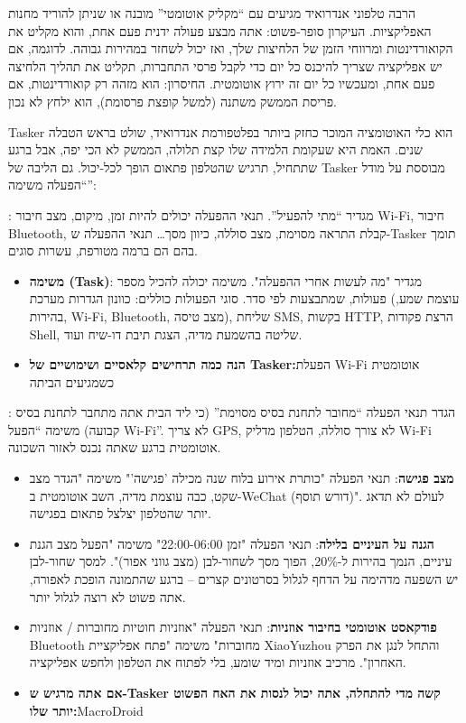 
הרבה טלפוני אנדרואיד מגיעים עם “מקליק אוטומטי” מובנה או שניתן להוריד מחנות האפליקציות. העיקרון סופר-פשוט: אתה מבצע פעולה ידנית פעם אחת, והוא מקליט את הקואורדינטות ומרווחי הזמן של הלחיצות שלך, ואז יכול לשחזר במהירות גבוהה. לדוגמה, אם יש אפליקציה שצריך להיכנס כל יום כדי לקבל פרסי התחברות, תקליט את תהליך הלחיצה פעם אחת, ומעכשיו כל יום זה ירוץ אוטומטית. החיסרון: הוא מזהה רק קואורדינטות, אם פריסת הממשק משתנה (למשל קופצת פרסומת), הוא ילחץ לא נכון.


Tasker הוא כלי האוטומציה המוכר כחזק ביותר בפלטפורמת אנדרואיד, שולט בראש הטבלה שנים. האמת היא שעקומת הלמידה שלו קצת תלולה, הממשק לא הכי יפה, אבל ברגע שתתחיל, תרגיש שהטלפון פתאום הופך לכל-יכול. גם הליבה של Tasker מבוססת על מודל “הפעלה משימה”:


: מגדיר “מתי להפעיל”. תנאי ההפעלה יכולים להיות זמן, מיקום, מצב חיבור Wi-Fi, חיבור Bluetooth, קבלת התראה מסוימת, מצב סוללה, כיוון מסך… תנאי ההפעלה ש-Tasker תומך בהם הם ברמה מטורפת, עשרות סוגים.

\begin{itemize}
  \item \textbf{משימה (Task)}: מגדיר "מה לעשות אחרי ההפעלה". משימה יכולה להכיל מספר פעולות, שמתבצעות לפי סדר. סוגי הפעולות כוללים: כוונון הגדרות מערכת (עוצמת שמע, בהירות, Wi-Fi, Bluetooth, מצב טיסה), שליחת SMS, בקשות HTTP, הרצת פקודות Shell, שליטה בהשמעת מדיה, הצגת תיבת דו-שיח ועוד.
  \item \textbf{הנה כמה תרחישים קלאסיים ושימושיים של Tasker:}הפעלת Wi-Fi אוטומטית כשמגיעים הביתה
\end{itemize}

: הגדר תנאי הפעלה “מחובר לתחנת בסיס מסוימת” (כי ליד הבית אתה מתחבר לתחנת בסיס קבועה) משימה “הפעל Wi-Fi”. לא צריך GPS, לא צורך סוללה, הטלפון מדליק Wi-Fi אוטומטית ברגע שאתה נכנס לאזור השכונה.

\begin{itemize}
  \item \textbf{מצב פגישה}: תנאי הפעלה "כותרת אירוע בלוח שנה מכילה 'פגישה'" משימה "הגדר מצב שקט, כבה עוצמת מדיה, השב אוטומטית ב-WeChat (דורש תוסף)". לעולם לא תדאג יותר שהטלפון יצלצל פתאום בפגישה.
  \item \textbf{הגנה על העיניים בלילה}: תנאי הפעלה "זמן 22:00-06:00" משימה "הפעל מצב הגנת עיניים, הנמך בהירות ל-20\%, הפוך מסך לשחור-לבן (מצב גווני אפור)". למסך שחור-לבן יש השפעה מדהימה על הדחף לגלול בסרטונים קצרים – ברגע שהתמונה הופכת לאפורה, אתה פשוט לא רוצה לגלול יותר.
  \item \textbf{פודקאסט אוטומטי בחיבור אוזניות}: תנאי הפעלה "אוזניות חוטיות מחוברות / אוזניות Bluetooth מחוברות" משימה "פתח אפליקציית XiaoYuzhou והתחל לנגן את הפרק האחרון". מרכיב אוזניות ומיד שומע, בלי לפתוח את הטלפון ולחפש אפליקציה.
  \item \textbf{אם אתה מרגיש ש-Tasker קשה מדי להתחלה, אתה יכול לנסות את האח הפשוט יותר שלו:}MacroDroid
\end{itemize}

